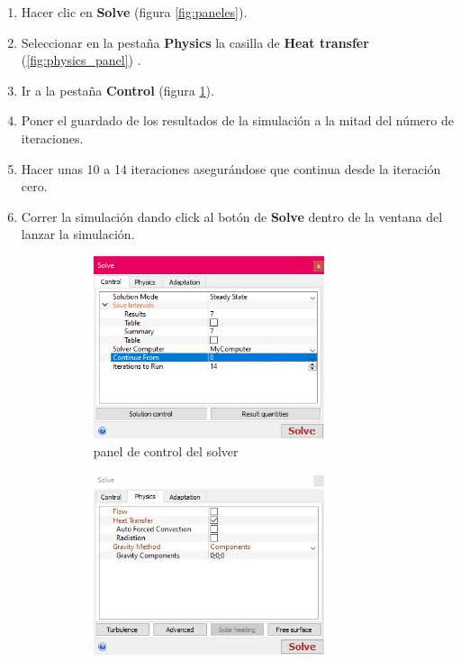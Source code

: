 \begin{enumerate}
	\item Hacer clic en \textbf{Solve} (figura \ref{fig:paneles}).
	\item Seleccionar en la pestaña \textbf{Physics} la casilla de \textbf{Heat transfer} (\ref{fig:physics_panel}) .
	\item Ir a la pestaña \textbf{Control} (figura \ref{fig:control_panel}).
	\item Poner el guardado de los resultados de la simulación a la mitad del número de iteraciones.
	\item Hacer unas 10 a 14 iteraciones asegurándose que continua desde la iteración cero.
	\item Correr la simulación dando click al botón de \textbf{Solve} dentro de la ventana del lanzar la simulación.
	\begin{figure}[H]
		\centering
		\begin{subfigure}[b]{0.48\textwidth}
			\centering
			\includegraphics[width=0.8\textwidth]{figuras/Procedimiento_Simulaciones/Conduccion/control_panel.png}
			\caption{panel de control del solver}
			\label{fig:control_panel}
		\end{subfigure}
	  \hfill
		\begin{subfigure}[b]{0.48\textwidth}
			\centering
			\includegraphics[width=0.8\textwidth]{figuras/Procedimiento_Simulaciones/Conduccion/physics_panel.png}

\end{subfigure}
\end{figure}
\end{enumerate}
